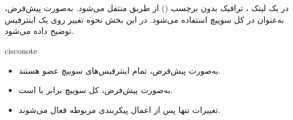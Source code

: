 \documentclass[11pt,letterpaper]{report}
\newenvironment{notebox}[1]{%
	\begin{noticebox}[title={\textbf{\faInfoCircle\ #1}}]{cisconote}
	}{%
	\end{noticebox}
}
\begin{document}
	\section{}
	\label{sec:native-vlan}

	در یک لینک ، ترافیک بدون برچسب
	() از طریق  منتقل می‌شود.
	به‌صورت پیش‌فرض،  به‌عنوان  در کل سوییچ
	استفاده می‌شود. در این بخش نحوه تغییر  روی یک
	اینترفیس  توضیح داده می‌شود.

	\begin{notebox}{\lr{Default Behavior}}
		\begin{itemize}[leftmargin=1.4em, itemsep=2pt]
			\item به‌صورت پیش‌فرض، تمام اینترفیس‌های سوییچ عضو  هستند.
			\item به‌صورت پیش‌فرض،  کل سوییچ برابر با  است.
			\item تغییرات  تنها پس از اعمال پیکربندی
			 مربوطه فعال می‌شوند.
		\end{itemize}
	\end{notebox}

	\subsection{}
\end{document}
